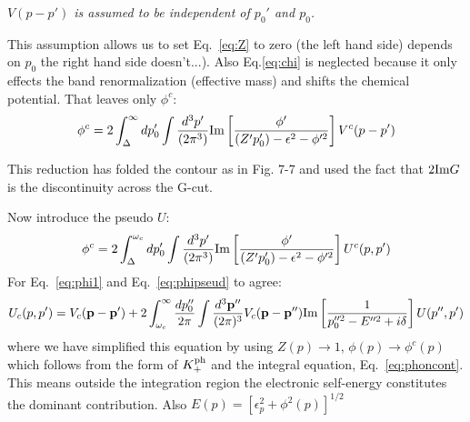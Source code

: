\emph{$V(p-p')$ is assumed to be independent of $p_0'$ and $p_0$.}

This assumption allows us to set Eq.~\ref{eq:Z} 
to zero (the left hand side)  depends on $p_0$ the right hand side doesn't...).
Also Eq.\ref{eq:chi} is neglected because it only effects the 
band renormalization (effective mass) and shifts the chemical potential.
That leaves only $\phi^{c}$:
%
\begin{equation}
\label{eq:phi1}
\phi^{c} = 2 \int_{\Delta}^{\infty}dp_{0}' \int \frac{d^{3}p'}{(2\pi^{3})} {\rm Im} \left[ \frac{\phi'}{(Z'p_{0}') - \epsilon^{2} -\phi'^{2}} 
\right]V^{c}(p-p')
\end{equation}

This reduction has folded the contour as in Fig. 7-7 and used the fact that $2{\rm Im} G$ is the discontinuity across the G-cut. 

Now introduce the pseudo $U$:
%
\begin{equation}
\label{eq:phipseud}
\phi^{c} = 2 \int_{\Delta}^{\omega_c}dp_{0}' \int \frac{d^{3}p'}{(2\pi^{3})} {\rm Im} \left[ \frac{\phi'}{(Z'p_{0}') - \epsilon^{2} -\phi'^{2}} 
\right]U^{c}(p,p')
\end{equation}
%
For Eq.~\ref{eq:phi1} and Eq.~\ref{eq:phipseud} to agree:
%
\begin{equation}
\label{eq:upseudo}
U_{c}(p,p') = V_{c}({\bf p}-{\bf p}') + 2 \int_{\omega_{c}}^{\infty}\frac{dp_{0}''}{2\pi}\int \frac{d^{3}{\bf p}''}{(2\pi)^{3}}V_{c}({\bf p}-{\bf p}'') {\rm Im}
\left[ \frac{1}{p_{0}''^{2} - E''^{2} +i\delta} \right] U(p'',p')
\end{equation}
%
where we have simplified this equation by using $Z(p) \rightarrow 1$, $\phi(p) \rightarrow \phi^{c}(p)$ which follows from the form 
of $K_{+}^{\rm ph}$ and the integral equation, Eq.~\ref{eq:phoncont}. This means outside the integration 
region the electronic self-energy constitutes the dominant contribution. Also $E(p) = [\epsilon^{2}_{p} + \phi^{2}(p)]^{1/2}$

